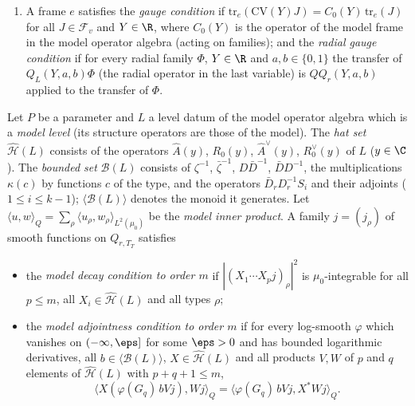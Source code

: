 \begin{definition}
\begin{enumerate}[label=(\roman*)]
  big-cell matrix attached to $(x,z)$ by $B_v$, and the $m_l$ are explicit integers.
\item A frame $e$ satisfies the \emph{gauge condition} if $\mathrm{tr}_e(\mathrm{CV}(Y)J)=C_0(Y)\,\mathrm{tr}_e(J)$ for all
  $J\in\mathcal F_v$ and $Y\in\R$, where $C_0(Y)$ is the operator of the model frame in the model operator algebra (acting on
  families); and the \emph{radial gauge condition} if for every radial family $\Phi$, $Y\in\R$ and $a,b\in\{0,1\}$ the
  transfer of $Q_L(Y,a,b)\Phi$ (the radial operator in the last variable) is $QQ_r(Y,a,b)$ applied to the transfer of
  $\Phi$.
\end{enumerate}
\end{definition}

\begin{definition}\label{pf:thmS-carrier:hatdef}
Let $P$ be a parameter and $L$ a level datum of the model operator algebra which is a \emph{model level} (its structure
operators are those of the model). The \emph{hat set} $\widehat{\mathcal H}(L)$ consists of the operators $\widehat A(y)$,
$R_0(y)$, $\widehat A^\vee(y)$, $R_0^\vee(y)$ of $L$ ($y\in\C$). The \emph{bounded set} $\mathcal B(L)$ consists of
$\zeta^{-1}$, $\bar\zeta^{-1}$, $D\bar D^{-1}$, $\bar DD^{-1}$, the multiplications $\kappa(c)$ by functions $c$ of the type,
and the operators $\bar D_rD_r^{-1}S_i$ and their adjoints ($1\le i\le k-1$); $\langle\mathcal B(L)\rangle$ denotes the
monoid it generates. Let $\langle u,w\rangle_Q=\sum_\rho\langle u_\rho,w_\rho\rangle_{L^2(\mu_0)}$ be the \emph{model inner
product}. A family $j=(j_\rho)$ of smooth functions on $Q_{r,T_T}$ satisfies
\begin{itemize}
\item the \emph{model decay condition to order $m$} if $|(X_1\cdots X_pj)_\rho|^2$ is $\mu_0$-integrable for all $p\le m$,
  all $X_i\in\widehat{\mathcal H}(L)$ and all types $\rho$;
\item the \emph{model adjointness condition to order $m$} if for every log-smooth $\varphi$ which vanishes on
  $(-\infty,\eps]$ for some $\eps>0$ and has bounded logarithmic derivatives, all $b\in\langle\mathcal B(L)\rangle$,
  $X\in\widehat{\mathcal H}(L)$ and all products $V,W$ of $p$ and $q$ elements of $\widehat{\mathcal H}(L)$ with
  $p+q+1\le m$,
  \[
  \bigl\langle X(\varphi(G_q)\,bVj),Wj\bigr\rangle_Q=\bigl\langle\varphi(G_q)\,bVj,X^*Wj\bigr\rangle_Q .
  \]
\end{itemize}
\end{definition}

